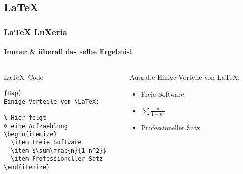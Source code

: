 \subsection{\LaTeX}
\begin{frame}[fragile]
	\frametitle{\LaTeX \hfill{} \footnotesize{LuXeria}}
	\framesubtitle{Immer \& überall das selbe Ergebnis!}
	\begin{columns}
		\begin{column}{5cm}
			\begin{block}{\LaTeX~Code}
				
\begin{lstlisting}{Bsp}
Einige Vorteile von \LaTeX:

% Hier folgt 
% eine Aufzaehlung
\begin{itemize}
  \item Freie Software
  \item $\sum\frac{n}{1-n^2}$
  \item Professioneller Satz
\end{itemize}
\end{lstlisting}
				
			\end{block}
		\end{column}
		\begin{column}{5cm}
			\begin{block}{Ausgabe}
				Einige Vorteile von \LaTeX:
				\begin{itemize}
					\item Freie Software
					\item $\sum\frac{n}{1-n^2}$
					\item Professioneller Satz
				\end{itemize}
			\end{block}
		\end{column}
	\end{columns}
\end{frame}
